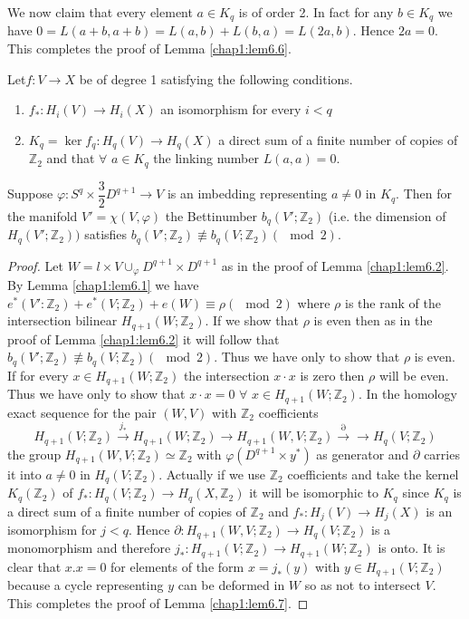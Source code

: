 We now claim that every element $a \in K_q$ is of order 2. In
fact for any $b \in K_q$ we have $0 = L (a+b, a+b) = L (a, b) + L
(b,a) = L (2a, b)$. Hence $2a = 0$. This completes the proof of Lemma
\ref{chap1:lem6.6}. 

\begin{lemma}\label{chap1:lem6.7} %
Let\pageoriginale $f : V \to X$ be of degree 1 satisfying the
following conditions.  
\begin{enumerate}[1)]
\item $f_* : H_i (V) \to H_i (X)$ an isomorphism for every $i< q$

\item $K_q = \ker f_q : H_q (V) \to H_q (X)$ a direct sum of a finite
  number of copies of $\mathbb{Z}_2$ and that $\forall$ $a \in K_q$
  the linking number $L (a, a) = 0$.  
\end{enumerate}
Suppose $\varphi : S^q \times \dfrac{3}{2} D^{q+1} \to V$ is an
imbedding representing $a \neq 0$ in $K_q$. Then for the manifold $V'
= \chi (V, \varphi)$ the Bettinumber $b_q(V' ; \mathbb{Z}_2)$ (i.e. the
dimension of $H_q (V' ;  \mathbb{Z}_2))$ satisfies $b_q (V' ;
\mathbb{Z}_2) \not \equiv b_q (V ;  \mathbb{Z}_2 )(\mod 2)$. 
\end{lemma} 

\begin{proof}
Let $W = l \times V \cup_\varphi D^{q+1} \times D^{q+1} $ as in the
proof of Lemma \ref{chap1:lem6.2}. By Lemma \ref{chap1:lem6.1} we have
$e^*(V' :  \mathbb{Z}_2) + 
e^* (V;  \mathbb{Z}_2) + e(W) \equiv \rho (\mod 2)$ where $ \rho$ is
the rank of the intersection bilinear $H_{q+1} (W;  \mathbb{Z}_2)$. If
we show that $ \rho$ is even then as in the proof of Lemma \ref{chap1:lem6.2} it will
follow that $b_q (V' ;  \mathbb{Z}_2 ) \not\equiv b_q (V;
\mathbb{Z}_2) (\mod 2)$. Thus we have only to show that $\rho$ is
even. If for every $x \in H_{q+1} (W;  \mathbb{Z}_2)$ the
intersection $x \cdot x$ is zero then $ \rho$ will be even. Thus we have
only to show that $x \cdot x = 0$ $\forall$ $x \in  H_{q+1} (W;
\mathbb{Z}_2 )$. In the homology exact sequence for the pair $(W, V)$
with $ \mathbb{Z}_2$ coefficients  
$$
H_{q+1} (V;  \mathbb{Z}_2) \xrightarrow{j_*} H_{q+1} (W;
\mathbb{Z}_2) \to H_{q+1} (W, V;  \mathbb{Z}_2) \xrightarrow{\partial}
\to H_q (V; \mathbb{Z}_2) 
$$
the group $H_{q+1} (W, V; \mathbb{Z}_2) \simeq \mathbb{Z}_2$ with
$\varphi (D^{q+1} \times y^*)$ as generator and\pageoriginale
$\partial $ carries it 
into $a \neq 0$ in $H_q (V; \mathbb{Z}_2)$. Actually if we use
$\mathbb{Z}_2$ coefficients and take the kernel $K_q (\mathbb{Z}_2)$
of $f_* : H_q (V; \mathbb{Z}_2) \to H_q (X, \mathbb{Z}_2)$ it will be
isomorphic to $K_q$ since $K_q$ is a direct sum of a finite number of
copies of $\mathbb{Z}_2$ and $f_* : H_j (V) \to H_j (X)$ is an
isomorphism for $j < q$. Hence $\partial : H_{q+1} (W, V ;
\mathbb{Z}_2) \to H_q (V; \mathbb{Z}_2)$ is a monomorphism and
therefore $j_* : H_{q+1} (V; \mathbb{Z}_2)  \to H_{q+1} (W;
\mathbb{Z}_2)$ is onto. It is clear that $x.x =0 $ for elements of the
form $x = j_* (y)$ with $y \in H_{q+1} (V; \mathbb{Z}_2)$ because
a cycle representing $y$ can be deformed in $W$ so as not to intersect
$V$. This completes the proof of Lemma \ref{chap1:lem6.7}. 
\end{proof}

